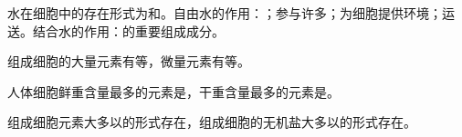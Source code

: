 \documentclass{exam-zh}
\begin{document}
\lipsum[1-7]

\begin{question}
  水在细胞中的存在形式为\fillin*[自由水]和\fillin*[结合水]。自由水的作用：\fillin*[细胞内良好的溶剂]；参与许多\fillin*[生物化学反应]；为细胞提供\fillin*[液体]环境；运送\fillin*[营养物质和代谢废物]。结合水的作用：\fillin*[细胞结构]的重要组成成分。
\end{question}

\begin{question}
  组成细胞的大量元素有\fillin*[C、H、O、N、P、S、K、Ca、Mg]等，微量元素有\fillin*[Fe、Mn、B、Zn、Mo、Cu]等。
\end{question}

\begin{question}
  人体细胞鲜重含量最多的元素是\fillin*[O]，干重含量最多的元素是\fillin*[C]。
\end{question}

\begin{question}
  组成细胞元素大多以\fillin*[化合物]的形式存在，组成细胞的无机盐大多以\fillin*[离子]的形式存在。
\end{question}
\end{document}
